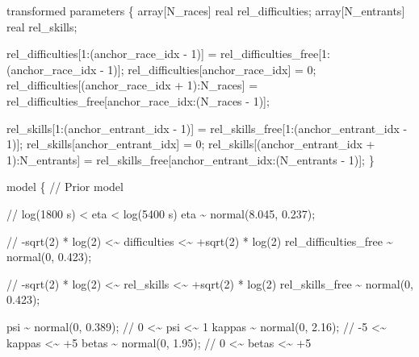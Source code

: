 \documentclass[
  letterpaper,
  DIV=11,
  numbers=noendperiod]{scrartcl}
\newenvironment{Shaded}{\begin{snugshade}}{\end{snugshade}}
\newcommand{\CommentTok}[1]{\textcolor[rgb]{0.37,0.37,0.37}{#1}}
\newcommand{\DataTypeTok}[1]{\textcolor[rgb]{0.68,0.00,0.00}{#1}}
\newcommand{\DecValTok}[1]{\textcolor[rgb]{0.68,0.00,0.00}{#1}}
\newcommand{\FloatTok}[1]{\textcolor[rgb]{0.68,0.00,0.00}{#1}}
\newcommand{\KeywordTok}[1]{\textcolor[rgb]{0.00,0.23,0.31}{#1}}
\newcommand{\NormalTok}[1]{\textcolor[rgb]{0.00,0.23,0.31}{#1}}
\begin{document}
\begin{codelisting}
\begin{Shaded}
\begin{Highlighting}[]
\KeywordTok{transformed parameters}\NormalTok{ \{}
  \DataTypeTok{array}\NormalTok{[N\_races] }\DataTypeTok{real}\NormalTok{ rel\_difficulties;}
  \DataTypeTok{array}\NormalTok{[N\_entrants] }\DataTypeTok{real}\NormalTok{ rel\_skills;}

\NormalTok{  rel\_difficulties[}\DecValTok{1}\NormalTok{:(anchor\_race\_idx {-} }\DecValTok{1}\NormalTok{)]}
\NormalTok{    =  rel\_difficulties\_free[}\DecValTok{1}\NormalTok{:(anchor\_race\_idx {-} }\DecValTok{1}\NormalTok{)];}
\NormalTok{  rel\_difficulties[anchor\_race\_idx] = }\DecValTok{0}\NormalTok{;}
\NormalTok{  rel\_difficulties[(anchor\_race\_idx + }\DecValTok{1}\NormalTok{):N\_races]}
\NormalTok{    = rel\_difficulties\_free[anchor\_race\_idx:(N\_races {-} }\DecValTok{1}\NormalTok{)];}

\NormalTok{  rel\_skills[}\DecValTok{1}\NormalTok{:(anchor\_entrant\_idx {-} }\DecValTok{1}\NormalTok{)]}
\NormalTok{    =  rel\_skills\_free[}\DecValTok{1}\NormalTok{:(anchor\_entrant\_idx {-} }\DecValTok{1}\NormalTok{)];}
\NormalTok{  rel\_skills[anchor\_entrant\_idx] = }\DecValTok{0}\NormalTok{;}
\NormalTok{  rel\_skills[(anchor\_entrant\_idx + }\DecValTok{1}\NormalTok{):N\_entrants]}
\NormalTok{    = rel\_skills\_free[anchor\_entrant\_idx:(N\_entrants {-} }\DecValTok{1}\NormalTok{)];}
\NormalTok{\}}

\KeywordTok{model}\NormalTok{ \{}
  \CommentTok{// Prior model}

  \CommentTok{// log(1800 s) \textless{} eta \textless{} log(5400 s)}
\NormalTok{  eta \textasciitilde{} normal(}\FloatTok{8.045}\NormalTok{, }\FloatTok{0.237}\NormalTok{);}

  \CommentTok{// {-}sqrt(2) * log(2) \textless{}\textasciitilde{} difficulties \textless{}\textasciitilde{} +sqrt(2) * log(2)}
\NormalTok{  rel\_difficulties\_free \textasciitilde{} normal(}\DecValTok{0}\NormalTok{, }\FloatTok{0.423}\NormalTok{);}

  \CommentTok{// {-}sqrt(2) * log(2) \textless{}\textasciitilde{} rel\_skills \textless{}\textasciitilde{} +sqrt(2) * log(2)}
\NormalTok{  rel\_skills\_free \textasciitilde{} normal(}\DecValTok{0}\NormalTok{, }\FloatTok{0.423}\NormalTok{);}

\NormalTok{  psi \textasciitilde{} normal(}\DecValTok{0}\NormalTok{, }\FloatTok{0.389}\NormalTok{);   }\CommentTok{//  0 \textless{}\textasciitilde{} psi    \textless{}\textasciitilde{} 1}
\NormalTok{  kappas \textasciitilde{} normal(}\DecValTok{0}\NormalTok{, }\FloatTok{2.16}\NormalTok{); }\CommentTok{// {-}5 \textless{}\textasciitilde{} kappas \textless{}\textasciitilde{} +5}
\NormalTok{  betas \textasciitilde{} normal(}\DecValTok{0}\NormalTok{, }\FloatTok{1.95}\NormalTok{);  }\CommentTok{//  0 \textless{}\textasciitilde{} betas  \textless{}\textasciitilde{} +5}


\end{Highlighting}
\end{Shaded}
\end{codelisting}
\end{document}
